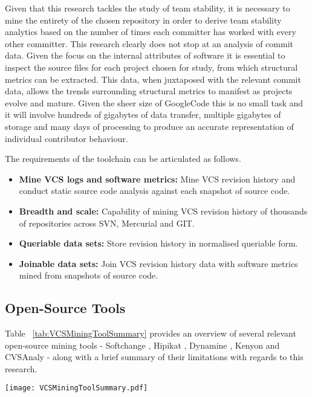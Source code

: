 Given that this research tackles the study of team stability, it is necessary to mine the entirety of the chosen repository in order to derive team stability analytics based on the number of times each committer has worked with every other committer. This research clearly does not stop at an analysis of commit data. Given the focus on the internal attributes of software it is essential to inspect the source files for each project chosen for study, from which structural metrics can be extracted. This data, when juxtaposed with the relevant commit data, allows the trends surrounding structural metrics to manifest as projects evolve and mature. Given the sheer size of GoogleCode this is no small task and it will involve hundreds of gigabytes of data transfer, multiple gigabytes of storage and many days of processing to produce an accurate representation of individual contributor behaviour.

The requirements of the toolchain can be articulated as follows.
\begin{itemize}
\item \textbf{Mine VCS logs and software metrics:} Mine VCS revision history and conduct static source code analysis against each snapshot of source code.
\item \textbf{Breadth and scale:} Capability of mining VCS revision history of thousands of repositories across SVN, Mercurial and GIT.
\item \textbf{Queriable data sets:} Store revision history in normalised queriable form.
\item \textbf{Joinable data sets:} Join VCS revision history data with software metrics mined from snapshots of source code.
\end{itemize}

\subsection{Open-Source Tools}
Table ~\ref{tab:VCSMiningToolSummary} provides an overview of several relevant open-source mining tools - Softchange \citep{german2004mining}, Hipikat \citep{vcubranic2003hipikat}, Dynamine \citep{livshits2005dynamine}, Kenyon \citep{bevan2005facilitating} and CVSAnaly \citep{robles2004remote} - along with a brief summary of their limitations with regards to this research.

\begin{table}
\centering 
{}
\begin{tabular}
 \centering 
 \texttt{[image: VCSMiningToolSummary.pdf]}
 \label{tab:VCSMiningToolSummary}
\end{tabular}
\end{table}

